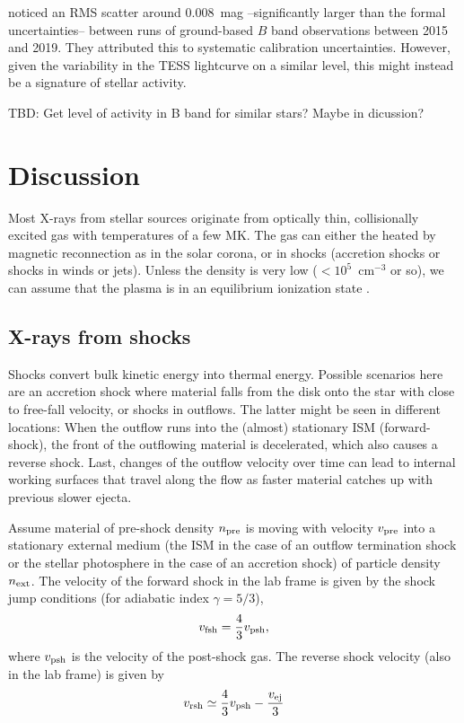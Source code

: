 \documentclass[]{aastex631}
\newcommand{\be}{\begin{equation}}
\newcommand{\ee}{\end{equation}}
\begin{document}
\cite{2020Natur.587..387H} noticed an RMS scatter around 0.008~mag --significantly larger than the formal uncertainties-- between runs of ground-based $B$ band observations between 2015 and 2019. They attributed this to systematic calibration uncertainties. However, given the variability in the TESS lightcurve on a similar level, this might instead be a signature of stellar activity.

TBD: Get level of activity in B band for similar stars? Maybe in dicussion?


\section{Discussion}  \label{sec:discussion}
Most X-rays from stellar sources originate from optically thin, collisionally excited gas with temperatures of a few MK. The gas can either the heated by magnetic reconnection as in the solar corona, or in shocks (accretion shocks or shocks in winds or jets). Unless the density is very low ($<10^5$~cm$^{-3}$ or so), we can assume that the plasma is in an equilibrium ionization state \citep[see, e.g. the accretion shock simulations in ][]{2007A&A...466.1111G}.

\subsection{X-rays from shocks}
Shocks convert bulk kinetic energy into thermal energy. Possible scenarios here are an accretion shock where material falls from the disk onto the star with close to free-fall velocity, or shocks in outflows. The latter might be seen in different locations: When the outflow runs into the (almost) stationary ISM (forward-shock), the front of the outflowing material is decelerated, which also causes a reverse shock. Last, changes of the outflow velocity over time can lead to internal working surfaces that travel along the flow as faster material catches up with previous slower ejecta.

Assume material of pre-shock density $n_{\rm pre}$ is moving with velocity $v_{\rm pre}$ into a stationary external medium (the ISM in the case of an outflow termination shock or the stellar photosphere in the case of an accretion shock) of particle density $n_{\rm ext}$.  The velocity of the forward shock in the lab frame is given by the shock jump conditions (for adiabatic index $\gamma = 5/3$),
\be
v_{\rm fsh} = \frac{4}{3}v_{\rm psh}, \label{eqn:vsh1}
\ee
where $v_{\rm psh}$ is the velocity of the post-shock gas.  The reverse shock velocity (also in the lab frame) is given by
\be
v_{\rm rsh} \simeq \frac{4}{3}v_{\rm psh} - \frac{v_{\rm ej}}{3}
\label{eqn:vsh2}
\ee
\end{document}
